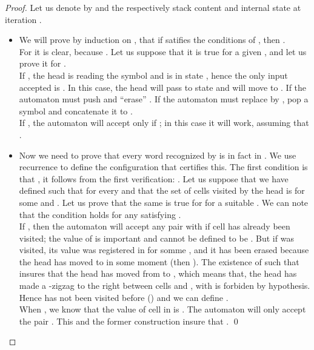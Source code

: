 \documentclass{llncs}
\begin{document}
\begin{proof}
Let us denote by  and  the respectively stack content and internal state at iteration .
\begin{itemize}
\item
We will prove by induction on , that if  satifies the conditions of , then .
\\
For  it is clear, because .
Let us suppose that it is true for a given , and let us prove it for .
\\
If , the head is reading the symbol  and is in state , hence the only input accepted is .
In this case, the head will pass to state  and will move to .
If  the automaton must push  and ``erase'' .
If  the automaton must replace  by , pop a symbol and concatenate it to .
\\
If , the automaton will accept  only if ; in this case it will work, assuming that .
\item
Now we need to prove that every word recognized by  is in fact in .
We use recurrence to define the configuration  that certifies this.
The first condition is that , it follows from the first verification: .
Let us suppose that we have defined  such that  for every  and that the set of cells visited by the head is  for some  and .
Let us prove that the same is true for  for a suitable .
We can note that the condition  holds for any  satisfying .
\\
If , then the automaton will accept any pair  with  if cell  has already been visited; the value of  is important and cannot be defined to be . But if  was visited, its value was registered in  for somme , and it has been erased because the head has moved to  in some moment (then ).
The existence of  such that  insures that the head has moved from  to , which means that, the head has made a -zigzag to the right between cells  and , with is forbiden by hypothesis. Hence  has not been visited before () and we can define .
\\
When , we know that the value of cell  in  is . The automaton will only accept the pair .
This and the former construction insure that .
\qed\end{itemize}\end{proof}
\end{document}
